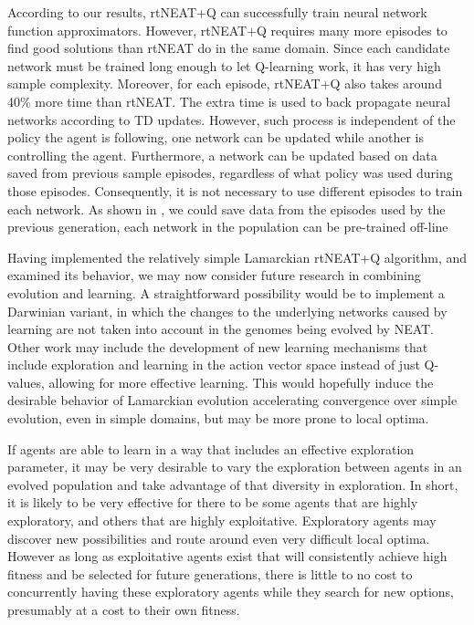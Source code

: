 \documentclass[letterpaper]{article}
\begin{document}
According to our results, rtNEAT+Q can successfully train neural network function approximators. However, rtNEAT+Q requires many more episodes to find good solutions than rtNEAT do in the same domain. Since each candidate network must be trained long enough to let Q-learning work, it has very high sample complexity. Moreover, for each episode, rtNEAT+Q also takes around 40\% more time than rtNEAT. The extra time is used to back propagate neural networks according to TD updates. However, such process is independent of the policy the agent is following, one network can be updated while another is controlling the agent. Furthermore, a network can be updated based on data saved from previous sample episodes, regardless of what policy was used during those episodes. Consequently,
it is not necessary to use different episodes to train each network. As shown in \cite{whiteson2006sample}, we could save data from the episodes used by the previous generation, each network in the population can be pre-trained off-line

Having implemented the relatively simple Lamarckian rtNEAT+Q algorithm, and examined its behavior, we may now consider future research in combining evolution and learning. A straightforward possibility would be to implement a Darwinian variant, in which the changes to the underlying networks caused by learning are not taken into account in the genomes being evolved by NEAT. Other work may include the development of new learning mechanisms that include exploration and learning in the action vector space instead of just Q-values, allowing for more effective learning. This would hopefully induce the desirable behavior of Lamarckian evolution accelerating convergence over simple evolution, even in simple domains, but may be more prone to local optima.

If agents are able to learn in a way that includes an effective exploration parameter, it may be very desirable to vary the exploration between agents in an evolved population and take advantage of that diversity in exploration. In short, it is likely to be very effective for there to be some agents that are highly exploratory, and others that are highly exploitative. Exploratory agents may discover new possibilities and route around even very difficult local optima. However as long as exploitative agents exist that will consistently achieve high fitness and be selected for future generations, there is little to no cost to concurrently having these exploratory agents while they search for new options, presumably at a cost to their own fitness.
\end{document}

